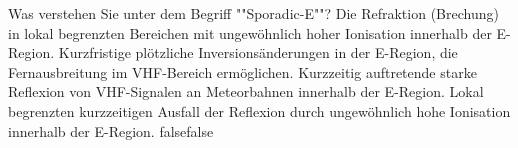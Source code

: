     {Was verstehen Sie unter dem Begriff ""Sporadic-E""?}
    {Die Refraktion (Brechung) in lokal begrenzten Bereichen mit ungewöhnlich hoher Ionisation innerhalb der E-Region.}
    {Kurzfristige plötzliche Inversionsänderungen in der E-Region, die Fernausbreitung im VHF-Bereich ermöglichen.}
    {Kurzzeitig auftretende starke Reflexion von VHF-Signalen an Meteorbahnen innerhalb der E-Region.}
    {Lokal begrenzten kurzzeitigen Ausfall der Reflexion durch ungewöhnlich hohe Ionisation innerhalb der E-Region.}
    {false}{false}